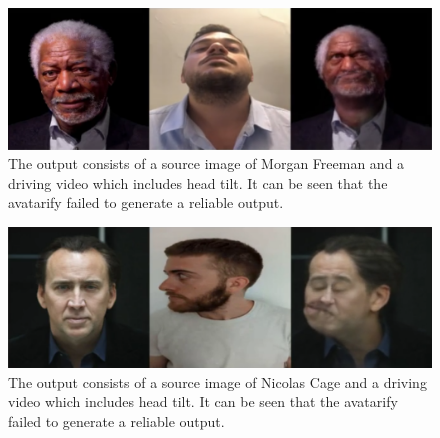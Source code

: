 \documentclass[english,12pt]{article}
\begin{document}


\begin{figure}[htb]
  \begin{centering}
      \includegraphics[scale=0.25]{images/‏‏Amit_tilt_freeman.PNG}
  \par\end{centering}
  \caption{\label{fig:Amit_tilt_freeman}The output consists of a source image of Morgan Freeman and a driving video which includes head tilt. It can be seen that the avatarify failed to generate a reliable output.}
\end{figure}

\begin{figure}[!htb]
  \begin{centering}
      \includegraphics[scale=0.25]{images/Oren_tilt_cage.PNG}
  \par\end{centering}
  \caption{\label{fig:Oren_tilt_cage}The output consists of a source image of Nicolas Cage and a driving video which includes head tilt. It can be seen that the avatarify failed to generate a reliable output.}
\end{figure}
\end{document}
